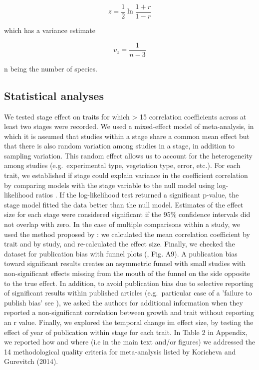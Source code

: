 \documentclass[a4paper]{article}\usepackage[]{graphicx}\usepackage[]{color}
\begin{document}
\[ z = \frac{1}{2} \ln \frac{1+r}{1-r} \]

which has a variance estimate

\[ v_z= \frac{1}{n-3} \]

n being the number of species.

\subsection*{Statistical analyses}\label{statistical-analyses}

We tested stage effect on traits for which > 15 correlation coefficients across at least two stages were recorded. We used a mixed-effect model of meta-analysis, in which it is assumed that studies within a stage share a common mean effect but that there is also random variation among studies in a stage, in addition to sampling variation. This random effect allows us to account for the heterogeneity among studies (e.g.~experimental type, vegetation type, error, etc.). For each trait, we established if stage could explain variance in the coefficient correlation by comparing models with the stage variable to the null model using log-likelihood ratios \citep{Zuur:2009cfa}. If the log-likelihood test returned a significant p-value, the stage model fitted the data better than the null model. Estimates of the effect size for each stage were considered significant if the 95\% confidence intervals did not overlap with zero. In the case of multiple comparisons within a study, we used the method proposed by \citet{Borenstein:2009um}: we calculated the mean correlation coefficient by trait and by study, and re-calculated the effect size. Finally, we checked the dataset for publication bias with funnel plots (\citealt{Koricheva:2013tz}, Fig. A9). A publication bias toward significant results creates an asymmetric funnel with small studies with non-significant effects missing from the mouth of the funnel on the side opposite to the true effect. In addition, to avoid publication bias due to selective reporting of significant results within published articles (e.g.~particular case of a 'failure to publish bias' see \citealt{Jennions:2013ta}), we asked the authors for additional information when they reported a non-significant correlation between growth and trait without reporting an r value. Finally, we explored the temporal change im effect size, by testing the effect of year of publication within stage for each trait. In Table 2 in Appendix, we reported how and where (i.e in the main text and/or figures) we addressed the 14 methodological quality criteria for meta-analysis listed by Koricheva and Gurevitch (2014). 
\end{document}

